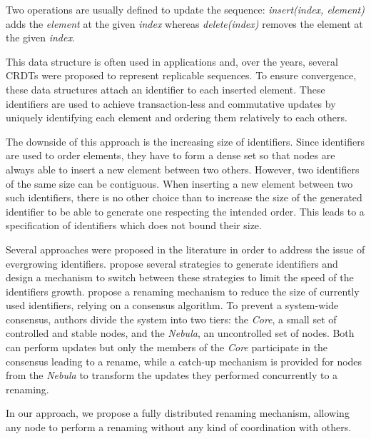 \documentclass[sigplan]{acmart}
\begin{document}
Two operations are usually defined to update the sequence:
\emph{insert(index, element)} adds the \emph{element} at the given \emph{index}
whereas \emph{delete(index)} removes the element at the given \emph{index}.

This data structure is often used in applications and, over the years, several \acp{CRDT} were proposed to represent replicable  sequences. %
To ensure convergence, these data structures attach an identifier to each inserted element.
These identifiers are used to achieve transaction-less and commutative updates by uniquely identifying each element and ordering them relatively to each others.

The downside of this approach is the increasing size of identifiers.
Since identifiers are used to order elements, they have to form a dense set so that nodes are always able to insert a new element between two others.
However, two identifiers of the same size can be contiguous.
When inserting a new element between two such identifiers, there is no other choice than to increase the size of the generated identifier to be able to generate one respecting the intended  order. This leads to a specification of identifiers which does not bound their size.

Several approaches were proposed in the literature in order to address the issue of evergrowing identifiers.
\citet{nedelec_2013_lseq} propose several strategies to generate identifiers and design a mechanism to switch between these strategies to limit the speed of the identifiers growth.
\citet{leia:inria-00397981} propose a renaming mechanism to reduce the size of currently used identifiers, relying on a consensus algorithm.
To prevent a system-wide consensus, authors divide the system into two tiers: the \emph{Core}, a small set of controlled and stable nodes, and the \emph{Nebula}, an uncontrolled set of nodes.
Both can perform updates but only the members of the \emph{Core} participate in the consensus leading to a rename, while a catch-up mechanism is provided for nodes from the \emph{Nebula} to transform the updates they performed concurrently to a renaming.


In our approach, we propose a fully distributed renaming mechanism, allowing any node to perform a renaming without any kind of coordination with others.
\end{document}
